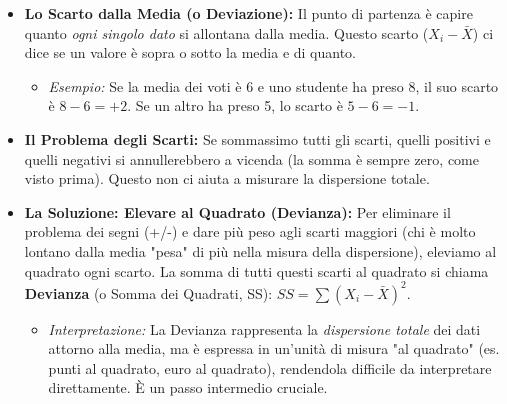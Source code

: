 \documentclass[12pt, a4paper]{article}
\newcommand{\samplemean}{\bar{X}} %
\begin{document}
\begin{itemize}
    \item \textbf{Lo Scarto dalla Media (o Deviazione):} Il punto di partenza è capire quanto \textit{ogni singolo dato} si allontana dalla media. Questo scarto ($X_i - \samplemean$) ci dice se un valore è sopra o sotto la media e di quanto.
        \begin{itemize}
            \item \textit{Esempio:} Se la media dei voti è 6 e uno studente ha preso 8, il suo scarto è $8 - 6 = +2$. Se un altro ha preso 5, lo scarto è $5 - 6 = -1$.
        \end{itemize}

    \item \textbf{Il Problema degli Scarti:} Se sommassimo tutti gli scarti, quelli positivi e quelli negativi si annullerebbero a vicenda (la somma è sempre zero, come visto prima). Questo non ci aiuta a misurare la dispersione totale.

    \item \textbf{La Soluzione: Elevare al Quadrato (Devianza):} Per eliminare il problema dei segni (+/-) e dare più peso agli scarti maggiori (chi è molto lontano dalla media "pesa" di più nella misura della dispersione), eleviamo al quadrato ogni scarto. La somma di tutti questi scarti al quadrato si chiama \textbf{Devianza} (o Somma dei Quadrati, SS): $SS = \sum (X_i - \samplemean)^2$.
        \begin{itemize}
            \item \textit{Interpretazione:} La Devianza rappresenta la \textit{dispersione totale} dei dati attorno alla media, ma è espressa in un'unità di misura "al quadrato" (es. punti al quadrato, euro al quadrato), rendendola difficile da interpretare direttamente. È un passo intermedio cruciale.
        \end{itemize}


\end{itemize}
\end{document}
